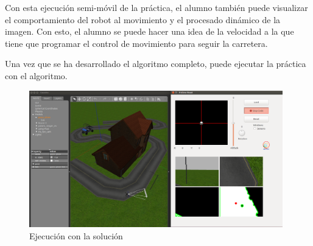 Con esta ejecución semi-móvil de la práctica, el alumno también puede visualizar el comportamiento del robot al movimiento y el procesado dinámico de la imagen. Con esto, el alumno se puede hacer una idea de la velocidad a la que tiene que programar el control de movimiento para seguir la carretera.

Una vez que se ha desarrollado el algoritmo completo, puede ejecutar la práctica con el algoritmo.

\begin{figure}[H]
  \begin{center}
    \includegraphics[width=0.98\textwidth]{figures/ejec_algoritmo_fr.png}
		\caption{Ejecución con la solución}
		\label{fig.ealgfr}
		\end{center}
\end{figure}